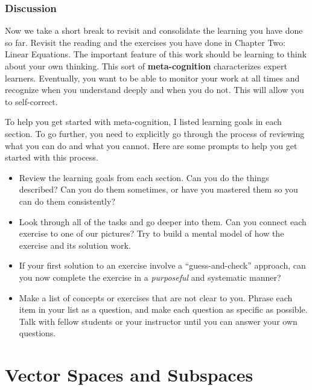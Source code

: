 \documentclass[10pt,]{book}
\newcommand{\terminology}[1]{\textbf{#1}}
\theoremstyle{plain}
\numberwithin{equation}{section}
\begin{document}
\subsection[Discussion]{Discussion}\label{subsection-57}
Now we take a short break to revisit and consolidate the learning you
    have done so far. Revisit the reading and the exercises you have done in
    Chapter Two: Linear Equations. The important feature of this work should be
    learning to think about your own thinking. This sort of \terminology{meta-cognition}
    characterizes expert learners. Eventually, you want to be able to monitor
    your work at all times and recognize when you understand deeply and when
    you do not. This will allow you to self-correct.
\par
To help you get started with meta-cognition, I listed learning goals in
    each section. To go further, you need to explicitly go through the process
    of reviewing what you can do and what you cannot. Here are some prompts to
    help you get started with this process.
    \begin{itemize}
\item{}
        Review the learning goals from each section. Can you do the things
        described? Can you do them sometimes, or have you mastered them so you
        can do them consistently?
      \item{}
        Look through all of the tasks and go deeper into them. Can you
        connect each exercise to one of our pictures? Try to build a mental
        model of how the exercise and its solution work.
      \item{}
        If your first solution to an exercise involve a ``guess-and-check''
        approach, can you now complete the exercise in a \emph{purposeful}
        and systematic manner?
      \item{}
        Make a list of concepts or exercises that are not clear to you. Phrase
        each item in your list as a question, and make each question as
        specific as possible. Talk with fellow students or your
        instructor until you can answer your own questions.
      \end{itemize}

\clearpage
\typeout{************************************************}
\typeout{************************************************}
\chapter[Vector Spaces and Subspaces]{Vector Spaces and Subspaces}\label{chapter-subspaces}
\end{document}
